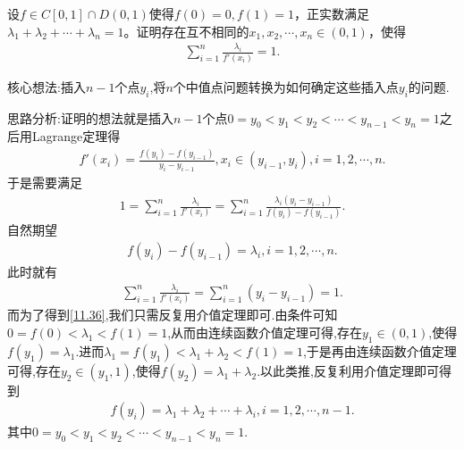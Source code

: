 \documentclass[../../main.tex]{subfiles}%
\begin{document}
\begin{example}
设\(f\in C[0,1]\cap D(0,1)\)使得\(f(0)=0,f(1)=1\)，正实数满足\(\lambda_1 + \lambda_2 + \cdots + \lambda_n = 1\)。证明存在互不相同的\(x_1,x_2,\cdots,x_n\in(0,1)\)，使得
\begin{align*}
\sum_{i = 1}^{n}\frac{\lambda_i}{f'(x_i)} = 1.
\end{align*} 
\end{example}
\begin{note}
核心想法:插入$n-1$个点$y_i$,将$n$个中值点问题转换为如何确定这些插入点$y_i$的问题.
\end{note}
\begin{remark}
思路分析:证明的想法就是插入\(n - 1\)个点\(0 = y_0 < y_1 < y_2 < \cdots < y_{n - 1} < y_n = 1\)之后用Lagrange定理得
\begin{align*}
f'(x_i)=\frac{f(y_i)-f(y_{i - 1})}{y_i - y_{i - 1}},x_i\in(y_{i - 1},y_i),i = 1,2,\cdots,n.
\end{align*}
于是需要满足
\begin{align*}
1=\sum_{i = 1}^{n}\frac{\lambda_i}{f'(x_i)}=\sum_{i = 1}^{n}\frac{\lambda_i(y_i - y_{i - 1})}{f(y_i)-f(y_{i - 1})}.
\end{align*}
自然期望
\begin{align}
f(y_i)-f(y_{i - 1})=\lambda_i,i = 1,2,\cdots,n.\label{11.36}
\end{align}
此时就有
\begin{align*}
\sum_{i = 1}^{n}\frac{\lambda_i}{f'(x_i)}=\sum_{i = 1}^{n}(y_i - y_{i - 1}) = 1.
\end{align*}
而为了得到\eqref{11.36},我们只需反复用介值定理即可.由条件可知$0=f(0)<\lambda_1<f(1)=1$,从而由连续函数介值定理可得,存在$y_1\in (0,1)$,使得$f(y_1)=\lambda_1$.进而$\lambda_1=f(y_1)<\lambda_1+\lambda_2<f(1)=1$,于是再由连续函数介值定理可得,存在$y_2\in (y_1,1)$,使得$f(y_2)=\lambda_1+\lambda_2$.以此类推,反复利用介值定理即可得到
\begin{align*}
f(y_i)=\lambda_1+\lambda_2+\cdots+\lambda_i,i = 1,2,\cdots,n - 1.
\end{align*}
其中\(0 = y_0 < y_1 < y_2 < \cdots < y_{n - 1} < y_n = 1\).
\end{remark}
\end{document}
